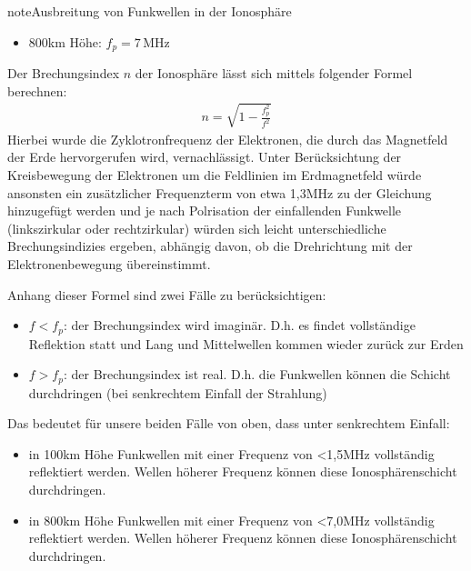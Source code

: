 \documentclass[letterpaper,10pt,english]{jupyterBook}
\begin{document}
\begin{sphinxadmonition}{note}{Ausbreitung von Funkwellen in der Ionosphäre}
\begin{itemize}
\item {} 
\sphinxAtStartPar
800km Höhe: \(f_p = 7\,\mathrm{MHz}\)

\end{itemize}

\sphinxAtStartPar
Der Brechungsindex \(n\) der Ionosphäre lässt sich mittels folgender Formel berechnen:
\begin{equation*}
\begin{split}n = \sqrt{1- \frac{f_p^2}{f^2}}\end{split}
\end{equation*}
\sphinxAtStartPar
Hierbei wurde die Zyklotronfrequenz der Elektronen, die durch das Magnetfeld der Erde  hervorgerufen wird, vernachlässigt. Unter Berücksichtung der Kreisbewegung der Elektronen um die Feldlinien im Erdmagnetfeld würde ansonsten ein zusätzlicher Frequenzterm von etwa 1,3MHz zu der Gleichung hinzugefügt werden und je nach Polrisation der einfallenden Funkwelle (links\sphinxhyphen{}zirkular oder recht\sphinxhyphen{}zirkular) würden sich leicht unterschiedliche Brechungsindizies ergeben, abhängig davon, ob die Drehrichtung mit der Elektronenbewegung übereinstimmt.

\sphinxAtStartPar
Anhang dieser Formel sind zwei Fälle zu berücksichtigen:
\begin{itemize}
\item {} 
\sphinxAtStartPar
\(f < f_p\): der Brechungsindex wird imaginär. D.h. es findet vollständige Reflektion statt und Lang\sphinxhyphen{} und Mittelwellen kommen wieder zurück zur Erden

\item {} 
\sphinxAtStartPar
\(f > f_p\): der Brechungsindex ist real. D.h. die Funkwellen können die Schicht durchdringen (bei senkrechtem Einfall der Strahlung)

\end{itemize}

\sphinxAtStartPar
Das bedeutet für unsere beiden Fälle von oben, dass unter senkrechtem Einfall:
\begin{itemize}
\item {} 
\sphinxAtStartPar
in 100km Höhe Funkwellen mit einer Frequenz von <1,5MHz vollständig reflektiert werden. Wellen höherer Frequenz können diese Ionosphärenschicht durchdringen.

\item {} 
\sphinxAtStartPar
in 800km Höhe Funkwellen mit einer Frequenz von <7,0MHz vollständig reflektiert werden. Wellen höherer Frequenz können diese Ionosphärenschicht durchdringen.


\end{itemize}
\end{sphinxadmonition}
\end{document}

